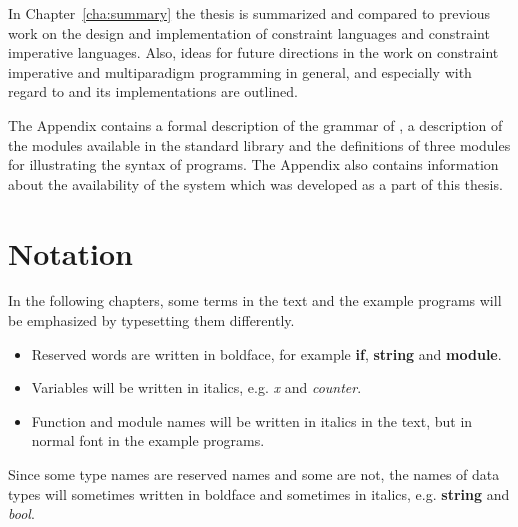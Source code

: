 In Chapter~\ref{cha:summary} the thesis is summarized and compared to
previous work on the design and implementation of constraint languages
and constraint imperative languages.  Also, ideas for future
directions in the work on constraint imperative and multiparadigm
programming in general, and especially with regard to \turtle{} and
its implementations are outlined.

The Appendix contains a formal description of the grammar of \turtle,
a description of the modules available in the standard library and the
definitions of three \turtle{} modules for illustrating the syntax of
\turtle{} programs.  The Appendix also contains information about the
availability of the \turtle{} system which was developed as a part of
this thesis.


\section{Notation}

In the following chapters, some terms in the text and the example
programs will be emphasized by typesetting them differently.
%
\begin{itemize}
\item Reserved words are written in boldface, for example {\bf if},
  {\bf string} and {\bf module}.

\item Variables will be written in italics, e.g. {\em x} and {\em
    counter}.

\item Function and module names will be written in italics in the
  text, but in normal font in the example programs.
\end{itemize}
%
Since some type names are reserved names and some are not, the names
of data types will sometimes written in boldface and sometimes in
italics, e.g. {\bf string} and {\em bool}.


